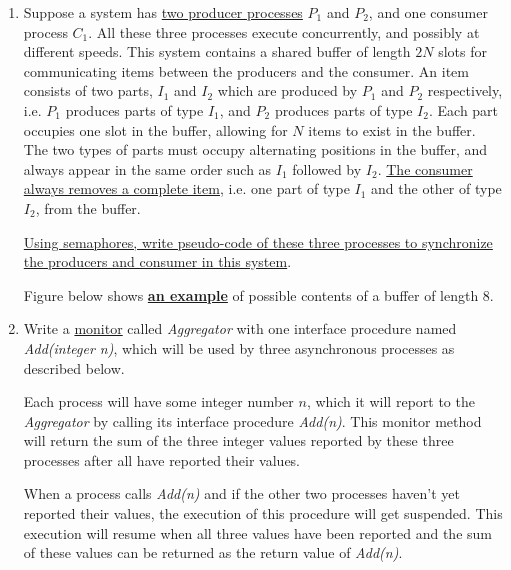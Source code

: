 \documentclass[11pt]{article}
\begin{document}
\begin{enumerate}
  \item Suppose a system has \ul{two producer processes} \(P_1\) and \(P_2\), and one consumer process \(C_1\).  All these three processes execute concurrently, and possibly at different speeds.  This system contains a shared buffer of length \(2N\) slots for communicating items between the producers and the consumer.  An item consists of two parts, \(I_1\) and \(I_2\) which are produced by \(P_1\) and \(P_2\) respectively, i.e. \(P_1\) produces parts of type \(I_1\), and \(P_2\) produces parts of type \(I_2\).  Each part occupies one slot in the buffer, allowing for \(N\) items to exist in the buffer.  The two types of parts must occupy alternating positions in the buffer, and always appear in the same order such as \(I_1\) followed by \(I_2\).  \ul{The consumer always removes a complete item}, i.e. one part of type \(I_1\) and the other of type \(I_2\), from the buffer.

    \ul{Using semaphores, write pseudo-code of these three processes to synchronize the producers and consumer in this system}.

    Figure below shows \textbf{\ul{an example}} of possible contents of a buffer of length 8.

    \begin{center}
    \end{center}
    \newpage

  \item Write a \ul{monitor} called \textit{Aggregator} with one interface procedure named \textit{Add(integer n)}, which will be used by three asynchronous processes as described below.

    Each process will have some integer number \(n\), which it will report to the \textit{Aggregator} by calling its interface procedure \textit{Add(n)}.  This monitor method will return the sum of the three integer values reported by these three processes after all have reported their values.

    When a process calls \textit{Add(n)} and if the other two processes haven’t yet reported their values, the execution of this procedure will get suspended.  This execution will resume when all three values have been reported and the sum of these values can be returned as the return value of \textit{Add(n)}.
    
\end{enumerate}
\end{document}
